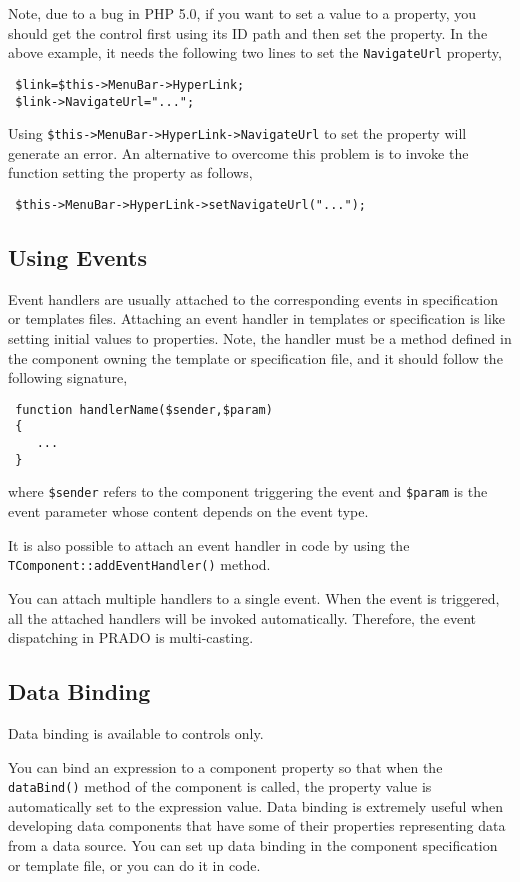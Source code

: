 \documentclass{book}
\begin{document}
Note, due to a bug in PHP 5.0, if you want to set a value to a
property, you should get the control first using its ID path and
then set the property. In the above example, it needs the
following two lines to set the \verb|NavigateUrl| property,
\begin{verbatim}
 $link=$this->MenuBar->HyperLink;
 $link->NavigateUrl="...";
\end{verbatim}
Using \verb|$this->MenuBar->HyperLink->NavigateUrl| to set the
property will generate an error. An alternative to overcome this
problem is to invoke the function setting the property as follows,
\begin{verbatim}
 $this->MenuBar->HyperLink->setNavigateUrl("...");
\end{verbatim}


\subsection{Using Events}

Event handlers are usually attached to the corresponding events in
specification or templates files. Attaching an event handler in
templates or specification is like setting initial values to
properties. Note, the handler must be a method defined in the
component owning the template or specification file, and it should
follow the following signature,
\begin{verbatim}
 function handlerName($sender,$param)
 {
    ...
 }
\end{verbatim}
where \verb|$sender| refers to the component triggering the event
and \verb|$param| is the event parameter whose content depends on
the event type.


It is also possible to attach an event handler in code by using
the \verb|TComponent::addEventHandler()| method.


You can attach multiple handlers to a single event. When the event
is triggered, all the attached handlers will be invoked
automatically. Therefore, the event dispatching in PRADO is
multi-casting.


\subsection{Data Binding}

Data binding is available to controls only.

You can bind an expression to a component property so that when
the \verb|dataBind()| method of the component is called, the
property value is automatically set to the expression value. Data
binding is extremely useful when developing data components that
have some of their properties representing data from a data
source. You can set up data binding in the component specification
or template file, or you can do it in code.
\end{document}
